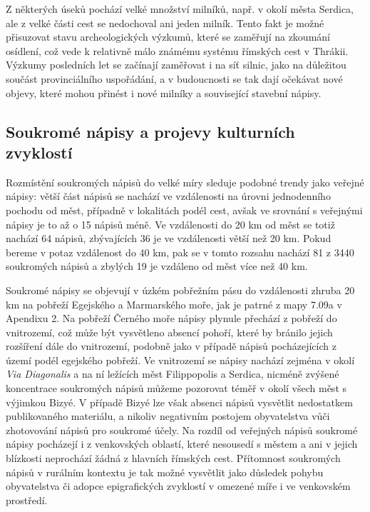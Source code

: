 Z některých úseků pochází velké množství milníků, např. v okolí města Serdica, ale z velké části cest se nedochoval ani jeden milník. Tento fakt je možné přisuzovat stavu archeologických výzkumů, které se zaměřují na zkoumání osídlení, což vede k relativně málo známému systému římských cest v Thrákii. Výzkumy posledních let se začínají zaměřovat i na síť silnic, jako na důležitou součást provinciálního uspořádání, a v budoucnosti se tak dají očekávat nové objevy, které mohou přinést i nové milníky a související stavební nápisy.

\subsection[soukromé-nápisy-a-projevy-kulturních-zvyklostí]{Soukromé nápisy a projevy kulturních zvyklostí}

Rozmístění soukromých nápisů do velké míry sleduje podobné trendy jako veřejné nápisy: větší část nápisů se nachází ve vzdálenosti na úrovni jednodenního pochodu od měst, případně v lokalitách podél cest, avšak ve srovnání s veřejnými nápisy je to až o 15  nápisů méně. Ve vzdálenosti do 20 km od měst se totiž nachází 64  nápisů, zbývajících 36  je ve vzdálenosti větší než 20 km. Pokud bereme v potaz vzdálenost do 40 km, pak se v tomto rozsahu nachází 81  z 3440 soukromých nápisů a zbylých 19  je vzdáleno od měst více než 40 km.

Soukromé nápisy se objevují v úzkém pobřežním pásu do vzdálenosti zhruba 20 km na pobřeží Egejského a Marmarského moře, jak je patrné z mapy 7.09a v Apendixu 2. Na pobřeží Černého moře nápisy plynule přechází z pobřeží do vnitrozemí, což může být vysvětleno absencí pohoří, které by bránilo jejich rozšíření dále do vnitrozemí, podobně jako v případě nápisů pocházejících z území podél egejského pobřeží. Ve vnitrozemí se nápisy nachází zejména v okolí {\em Via Diagonalis} a na ní ležících měst Filippopolis a Serdica, nicméně zvýšené koncentrace soukromých nápisů můžeme pozorovat téměř v okolí všech měst s výjimkou Bizyé. V případě Bizyé lze však absenci nápisů vysvětlit nedostatkem publikovaného materiálu, a nikoliv negativním postojem obyvatelstva vůči zhotovování nápisů pro soukromé účely. Na rozdíl od veřejných nápisů soukromé nápisy pocházejí i z venkovských oblastí, které nesousedí s městem a ani v jejich blízkosti neprochází žádná z hlavních římských cest. Přítomnost soukromých nápisů v rurálním kontextu je tak možné vysvětlit jako důsledek pohybu obyvatelstva či adopce epigrafických zvyklostí v omezené míře i ve venkovském prostředí.


